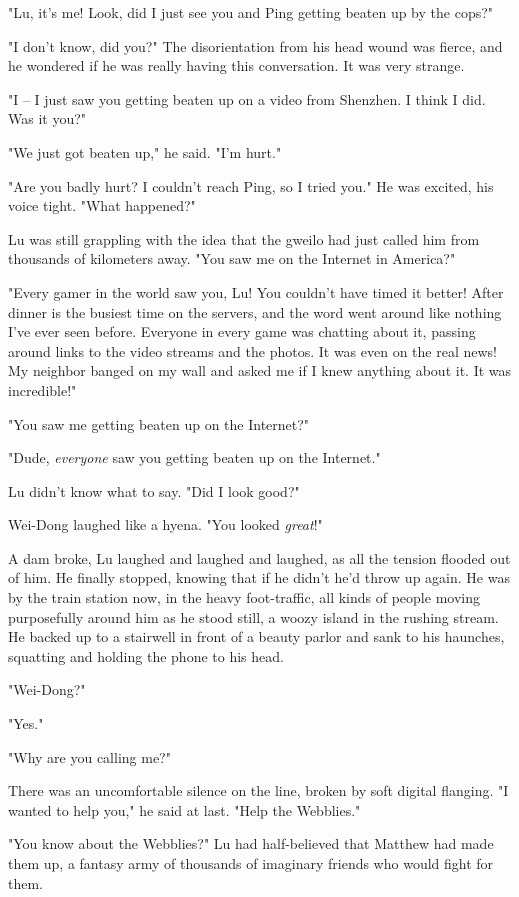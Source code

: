 "Lu, it's me! Look, did I just see you and Ping getting beaten up
by the cops?"

"I don't know, did you?" The disorientation from his head wound was
fierce, and he wondered if he was really having this conversation.
It was very strange.

"I -- I just saw you getting beaten up on a video from Shenzhen. I
think I did. Was it you?"

"We just got beaten up," he said. "I'm hurt."

"Are you badly hurt? I couldn't reach Ping, so I tried you." He was
excited, his voice tight. "What happened?"

Lu was still grappling with the idea that the gweilo had just
called him from thousands of kilometers away. "You saw me on the
Internet in America?"

"Every gamer in the world saw you, Lu! You couldn't have timed it
better! After dinner is the busiest time on the servers, and the
word went around like nothing I've ever seen before. Everyone in
every game was chatting about it, passing around links to the video
streams and the photos. It was even on the real news! My neighbor
banged on my wall and asked me if I knew anything about it. It was
incredible!"

"You saw me getting beaten up on the Internet?"

"Dude, \emph{everyone} saw you getting beaten up on the Internet."

Lu didn't know what to say. "Did I look good?"

Wei-Dong laughed like a hyena. "You looked \emph{great}!"

A dam broke, Lu laughed and laughed and laughed, as all the tension
flooded out of him. He finally stopped, knowing that if he didn't
he'd throw up again. He was by the train station now, in the heavy
foot-traffic, all kinds of people moving purposefully around him as
he stood still, a woozy island in the rushing stream. He backed up
to a stairwell in front of a beauty parlor and sank to his
haunches, squatting and holding the phone to his head.

"Wei-Dong?"

"Yes."

"Why are you calling me?"

There was an uncomfortable silence on the line, broken by soft
digital flanging. "I wanted to help you," he said at last. "Help
the Webblies."

"You know about the Webblies?" Lu had half-believed that Matthew
had made them up, a fantasy army of thousands of imaginary friends
who would fight for them.

